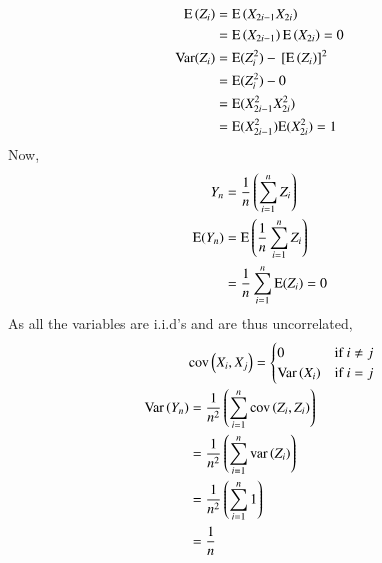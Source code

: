 \documentclass[journal,12pt,Twocolumn]{IEEEtran}
\theoremstyle{remark}
\begin{document}
\begin{align}
\text{E}\left(Z_i\right)&=\text{E}\left(X_{2i-1}X_{2i}\right) \\
&=\text{E}\left(X_{2i-1}\right)\text{E}\left(X_{2i}\right) = 0 \\
\text{Var}(Z_i)&=\text{E}(Z_i^2)-{}\left[\text{E}\left(Z_i\right)\right]^2 \\
&=\text{E}(Z_i^2)-0 \\ 
&=\text{E}(X_{2i-1}^2X_{2i}^2) \\
&=\text{E}(X_{2i-1}^2)\text{E}(X_{2i}^2) = 1  
\end{align}
Now,
\begin{align}
Y_n&=\frac{1}{n}\left(\sum_{i=1}^{n} Z_i\right) \\
\text{E}(Y_n)&=\text{E}\left(\frac{1}{n}\sum_{i=1}^{n} Z_i\right) \\
&= \frac{1}{n}\sum_{i=1}^{n} \text{E}(Z_i) = 0 
\end{align}
As all the variables are i.i.d's and are thus uncorrelated,
\begin{align}
&\text{cov}\left(X_i, X_j\right) =
\begin{cases}
	0 & \text{if } i \ne j\\
    \text{Var}\left(X_i\right) & \text{if } i = j
\end{cases} \\
\text{Var}\left(Y_n\right)&=\frac{1}{n^2}\left(\sum_{i=1}^{n}\text{cov}\left(Z_i, Z_i\right)\right)\\
&= \frac{1}{n^2} \left(\sum_{i=1}^{n} \text{var}\left(Z_i\right)\right)\\
&= \frac{1}{n^2} \left(\sum_{i=1}^{n} 1\right)\\
&= \frac{1}{n}
\end{align}
\end{document}
